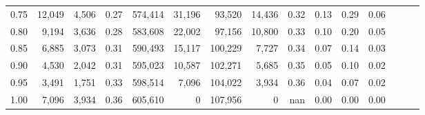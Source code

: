 \begin{tabular}{rrrrrrrrrrrrrrr}
0.75 &  12,049 &  4,506 &  0.27 &  574,414 &   31,196 &   93,520 &   14,436 &  0.32 &  0.13 &  0.29 &      0.06 \\
0.80 &   9,194 &  3,636 &  0.28 &  583,608 &   22,002 &   97,156 &   10,800 &  0.33 &  0.10 &  0.20 &      0.05 \\
0.85 &   6,885 &  3,073 &  0.31 &  590,493 &   15,117 &  100,229 &    7,727 &  0.34 &  0.07 &  0.14 &      0.03 \\
0.90 &   4,530 &  2,042 &  0.31 &  595,023 &   10,587 &  102,271 &    5,685 &  0.35 &  0.05 &  0.10 &      0.02 \\
0.95 &   3,491 &  1,751 &  0.33 &  598,514 &    7,096 &  104,022 &    3,934 &  0.36 &  0.04 &  0.07 &      0.02 \\
1.00 &   7,096 &  3,934 &  0.36 &  605,610 &        0 &  107,956 &        0 &   nan &  0.00 &  0.00 &      0.00 \\
\bottomrule
\end{tabular}

